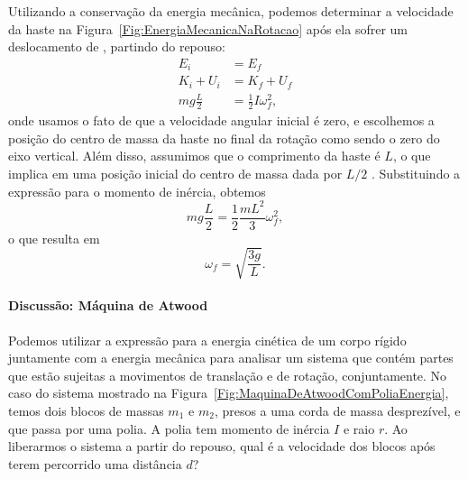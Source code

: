 Utilizando a conservação da energia mecânica, podemos determinar a velocidade da haste na Figura~\ref{Fig:EnergiaMecanicaNaRotacao} após ela sofrer um deslocamento de , partindo do repouso:
\begin{align}
    E_i &= E_f \\
    K_i + U_i &= K_f + U_f \\
    mg\frac{L}{2} &= \frac{1}{2} I \omega_f^2,
\end{align}
%
onde usamos o fato de que a velocidade angular inicial é zero, e escolhemos a posição do centro de massa da haste no final da rotação como sendo o zero do eixo vertical. Além disso, assumimos que o comprimento da haste é $L$, o que implica em uma posição inicial do centro de massa dada por $L/2$ . Substituindo a expressão para o momento de inércia, obtemos
\begin{equation}
    mg\frac{L}{2} = \frac{1}{2} \frac{mL^2}{3} \omega_f^2,
\end{equation}
%
o que resulta em
\begin{equation}
    \omega_f = \sqrt{\frac{3g}{L}}.
\end{equation}

\paragraph{Discussão: Máquina de Atwood}


Podemos utilizar a expressão para a energia cinética de um corpo rígido juntamente com a energia mecânica para analisar um sistema que contém partes que estão sujeitas a movimentos de translação e de rotação, conjuntamente. No caso do sistema mostrado na Figura~\ref{Fig:MaquinaDeAtwoodComPoliaEnergia}, temos dois blocos de massas $m_1$ e $m_2$, presos a uma corda de massa desprezível, e que passa por uma polia. A polia tem momento de inércia $I$ e raio $r$. Ao liberarmos o sistema a partir do repouso, qual é a velocidade dos blocos após terem percorrido uma distância $d$?

